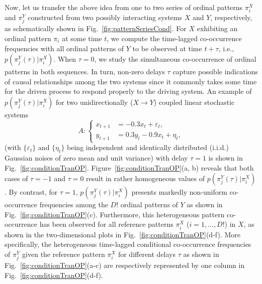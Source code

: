 \documentclass[12pt,aip,cha,reprint,nofootinbib]{revtex4-1}
\begin{document}
Now, let us transfer the above idea from one to two series of ordinal patterns $\pi_i^{X}$ and $\pi_j^{Y}$ constructed from two possibly interacting systems $X$ and $Y$, respectively, as schematically shown in Fig.~\ref{fig:patternSeriesCond}. For $X$ exhibiting an ordinal pattern $\pi_i$ at some time $t$, we compute the time-lagged co-occurrence frequencies with all ordinal patterns of $Y$ to be observed at time $t+\tau$, i.e., $p(\pi_{j}^{Y}(\tau) | \pi_i^{X})$. When $\tau = 0$, we study the simultaneous co-occurrence of ordinal patterns in both sequences. In turn, non-zero delays $\tau$ capture possible indications of causal relationships among the two systems since it commonly takes some time for the driven process to respond properly to the driving system. An example of $p(\pi_{j}^{Y}(\tau) | \pi_i^{X})$ for two unidirectionally ($X \to Y$) coupled linear stochastic systems \cite{LiPRE2018}
\begin{equation} \label{eq:B}
A: \left \{ \begin{aligned}
x_{t+1} &= -0.3 x_{t} + \varepsilon_t, \\
y_{t+1} &= 0.3 y_{t} - 0.9 x_{t} + \eta_t,
\end{aligned}
\right.
\end{equation}
(with $\{ \varepsilon_t \}$ and $\{ \eta_t \}$ being independent and identically distributed (i.i.d.) Gaussian noises of zero mean and unit variance) with delay $\tau = 1$ is shown in Fig.~\ref{fig:conditionTranOP}. Figure~\ref{fig:conditionTranOP}(a, b) reveals that both cases of $\tau = -1$ and $\tau = 0$ result in rather homogeneous values of $p(\pi_{j}^{Y}(\tau) | \pi_i^{X})$. By contrast, for $\tau=1$, $p(\pi_{j}^{Y}(\tau) | \pi_i^{X})$ presents markedly non-uniform co-occurrence frequencies among the $D!$ ordinal patterns of $Y$ as shown in Fig.~\ref{fig:conditionTranOP}(c). Furthermore, this heterogeneous pattern co-occurrence has been observed for all reference patterns $\pi_i^{X}$ ($i = 1, \dots, D!$) in $X$, as shown in the two-dimensional plots in Fig.~\ref{fig:conditionTranOP}(d-f). More specifically, the heterogeneous time-lagged conditional co-occurrence frequencies of $\pi_j^{Y}$ given the reference pattern $\pi_i^{X}$ for different delays $\tau$ as shown in Fig.~\ref{fig:conditionTranOP}(a-c) are respectively represented by one column in Fig.~\ref{fig:conditionTranOP}(d-f). 
\end{document}
